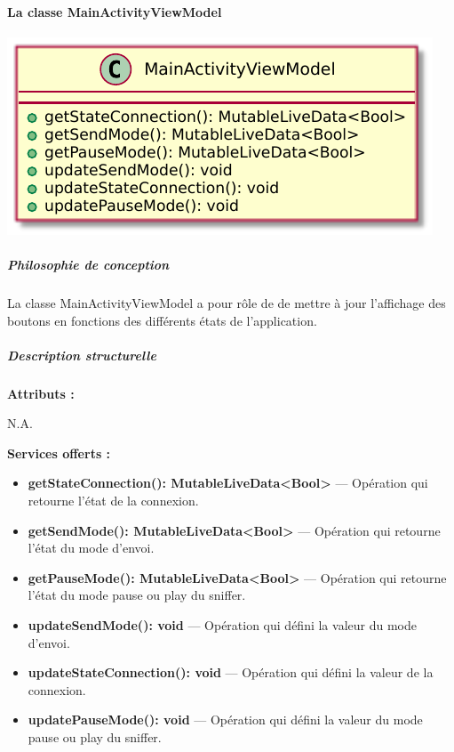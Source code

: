 \paragraph{La classe MainActivityViewModel}

\begin{minipage}
    {\linewidth}
    \centering
    \includegraphics[width=0.80\linewidth]{../schemas/Conception_detaillee/classe_mainActivityViewModel.pdf}
\end{minipage}

\subparagraph{Philosophie de conception \newline} 

\medspace

La classe MainActivityViewModel a pour rôle de de mettre à jour l'affichage des boutons en fonctions des différents états de l'application. 

\subparagraph{Description structurelle \newline}

\medspace

\textbf{Attributs :}

N.A. 

\textbf{Services offerts :}

\begin{itemize}
    \item \textbf{getStateConnection(): MutableLiveData<Bool>} --- Opération qui retourne l'état de la connexion. 
    \item \textbf{getSendMode(): MutableLiveData<Bool>} --- Opération qui retourne l'état du mode d'envoi.
    \item \textbf{getPauseMode(): MutableLiveData<Bool>} --- Opération qui retourne l'état du mode pause ou play du sniffer.
    \item \textbf{updateSendMode(): void } --- Opération qui défini la valeur du mode d'envoi. 
    \item \textbf{updateStateConnection(): void} --- Opération qui défini la valeur de la connexion. 
    \item \textbf{updatePauseMode(): void} --- Opération qui défini la valeur du mode pause ou play du sniffer.
\end{itemize}
